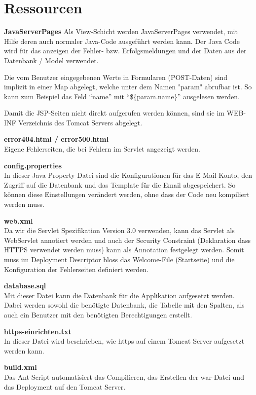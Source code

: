\documentclass[12pt]{scrartcl}
\begin{document}
\section{Ressourcen}
\textbf{JavaServerPages}\newline
Als View-Schicht werden JavaServerPages verwendet, mit Hilfe deren auch normaler Java-Code ausgeführt werden kann. Der Java Code wird für das anzeigen der Fehler- bzw. Erfolgsmeldungen und der Daten aus der Datenbank / Model verwendet.

Die vom Benutzer eingegebenen Werte in Formularen (POST-Daten) sind implizit in einer Map abgelegt, welche unter dem Namen "param" abrufbar ist. So kann zum Beispiel das Feld "`name"' mit "`\$\{param.name\}"' ausgelesen werden.

Damit die JSP-Seiten nicht direkt aufgerufen werden können, sind sie im WEB-INF Verzeichnis des Tomcat Servers abgelegt.

\textbf{error404.html / error500.html}\\
Eigene Fehlerseiten, die bei Fehlern im Servlet angezeigt werden.

\textbf{config.properties}\\
In dieser Java Property Datei sind die Konfigurationen für das E-Mail-Konto, den Zugriff auf die Datenbank und das Template für die Email abgespeichert. So können diese Einstellungen verändert werden, ohne dass der Code neu kompiliert werden muss.

\textbf{web.xml}\\
Da wir die Servlet Spezifikation Version 3.0 verwenden, kann das Servlet als WebServlet annotiert werden und auch der Security Constraint (Deklaration dass HTTPS verwendet werden muss) kann als Annotation festgelegt werden. Somit muss im Deployment Descriptor bloss das Welcome-File (Startseite) und die Konfiguration der Fehlerseiten definiert werden.

\textbf{database.sql}\\
Mit dieser Datei kann die Datenbank für die Applikation aufgesetzt werden. Dabei werden sowohl die benötigte Datenbank, die Tabelle mit den Spalten, als auch ein Benutzer mit den benötigten Berechtigungen erstellt.

\textbf{https-einrichten.txt}\\
In dieser Datei wird beschrieben, wie https auf einem Tomcat Server aufgesetzt werden kann.

\textbf{build.xml}\\
Das Ant-Script automatisiert das Compilieren, das Erstellen der war-Datei und das Deployment auf den Tomcat Server.
\end{document}
